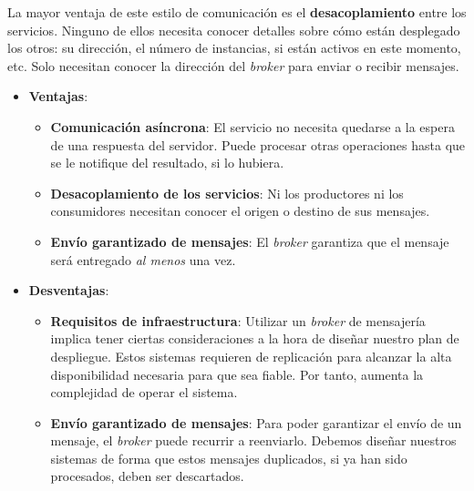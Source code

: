 \begin{itemize}
  La mayor ventaja de este estilo de comunicación es el \textbf{desacoplamiento} entre los servicios. \cite{korabUnderstandingMessageBrokers2017}
  Ninguno de ellos necesita conocer detalles sobre cómo están desplegado los otros: su dirección, el número de instancias, si están activos en este momento, etc. Solo necesitan conocer la dirección del \textit{broker} para enviar o recibir mensajes.

  \begin{itemize}
    \item \textbf{Ventajas}:

    \begin{itemize}
      \item \textbf{Comunicación asíncrona}: El servicio no necesita quedarse a la espera de una respuesta del servidor. Puede procesar otras operaciones hasta que se le notifique del resultado, si lo hubiera.

      \item \textbf{Desacoplamiento de los servicios}: Ni los productores ni los consumidores necesitan conocer el origen o destino de sus mensajes.

      \item \textbf{Envío garantizado de mensajes}: El \textit{broker} garantiza que el mensaje será entregado \textit{al menos} una vez.

    \end{itemize}

    \item \textbf{Desventajas}:

    \begin{itemize}
      \item \textbf{Requisitos de infraestructura}: Utilizar un \textit{broker} de mensajería implica tener ciertas consideraciones a la hora de diseñar nuestro plan de despliegue. Estos sistemas requieren de replicación para alcanzar la alta disponibilidad necesaria para que sea fiable. \cite{newmanBuildingMicroservicesDesigning2021} Por tanto, aumenta la complejidad de operar el sistema.

      \item \textbf{Envío garantizado de mensajes}: Para poder garantizar el envío de un mensaje, el \textit{broker} puede recurrir a reenviarlo. Debemos diseñar nuestros sistemas de forma que estos mensajes duplicados, si ya han sido procesados, deben ser descartados.
    \end{itemize}
  \end{itemize}
\end{itemize}

